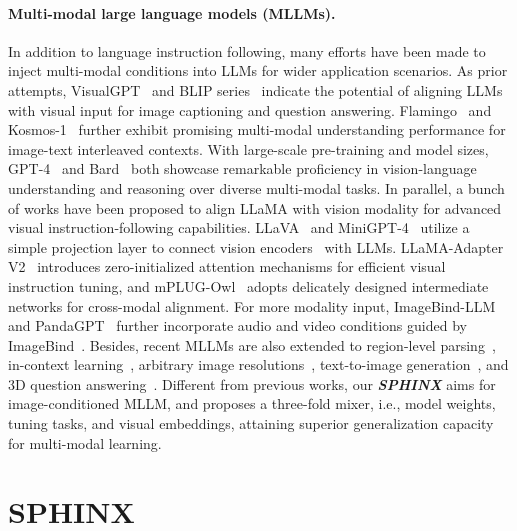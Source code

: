 \documentclass{article} \usepackage{iclr2024_conference,times}
\begin{document}
\paragraph{Multi-modal large language models (MLLMs).}
In addition to language instruction following, many efforts have been made to inject multi-modal conditions into LLMs for wider application scenarios. As prior attempts, VisualGPT~\citep{Chen2021VisualGPTDA} and BLIP series~\citep{li2023blip,Li2022BLIPBL,Dai2023InstructBLIPTG} indicate the potential of aligning LLMs with visual input for image captioning and question answering. Flamingo~\citep{alayrac2022flamingo} and Kosmos-1~\citep{huang2023kosmos} further exhibit promising multi-modal understanding performance for image-text interleaved contexts. With large-scale pre-training and model sizes, GPT-4~\citep{OpenAI2023GPT4TR} and Bard~\citep{bard} both showcase remarkable proficiency in vision-language understanding and reasoning over diverse multi-modal tasks.
In parallel, a bunch of works have been proposed to align LLaMA with vision modality for advanced visual instruction-following capabilities. LLaVA~\citep{llava} and MiniGPT-4~\citep{zhu2023minigpt} utilize a simple projection layer to connect vision encoders~\citep{li2023blip,radford2021learning} with LLMs. LLaMA-Adapter V2~\citep{gao2023llamaadapter} introduces zero-initialized attention mechanisms for efficient visual instruction tuning, and mPLUG-Owl~\citep{ye2023mplug} adopts delicately designed intermediate networks for cross-modal alignment. For more modality input, ImageBind-LLM~\citep{han2023imagebind} and PandaGPT~\citep{Su2023PandaGPTOM} further incorporate audio and video conditions guided by ImageBind~\citep{Girdhar2023ImageBindOE}. Besides, recent MLLMs are also extended to region-level parsing~\citep{chen2023shikra,peng2023kosmos}, in-context learning~\citep{Li2023MIMICITMI,Li2023OtterAM}, arbitrary image resolutions~\citep{fuyu-8b}, text-to-image generation~\citep{wen2023improving,dong2023dreamllm}, and 3D question answering~\citep{Xu2023PointLLMEL,Guo2023PointBindP,hong20233d}. Different from previous works, our \textcolor{Goldenrod3}{\textbf{\textit{SPHINX}}} aims for image-conditioned MLLM, and proposes a three-fold mixer, i.e., model weights, tuning tasks, and visual embeddings, attaining superior generalization capacity for multi-modal learning.


\section{SPHINX}
\end{document}
